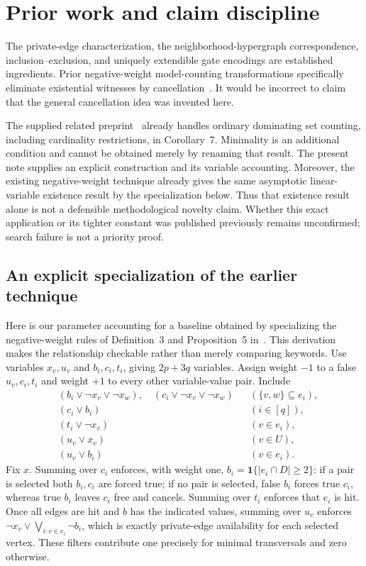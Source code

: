 \documentclass[11pt]{article}
\theoremstyle{remark}\newtheorem{remark}[theorem]{Remark}
\newcommand{\ind}[1]{\mathbf 1\{#1\}}
\begin{document}
\section{Prior work and claim discipline}\label{sec:prior}
The private-edge characterization, the neighborhood-hypergraph correspondence,
inclusion--exclusion, and uniquely extendible gate encodings are established
ingredients. Prior negative-weight model-counting transformations specifically
eliminate existential witnesses by cancellation~\cite{skolem}. It would be
incorrect to claim that the general cancellation idea was invented here.

The supplied related preprint~\cite{claude} already handles ordinary dominating
set counting, including cardinality restrictions, in Corollary~7. Minimality
is an additional condition and cannot be obtained merely by renaming that
result. The present note supplies an explicit construction and its variable
accounting. Moreover, the existing negative-weight technique already gives
the same asymptotic linear-variable existence result by the specialization
below. Thus that existence result alone is not a defensible methodological
novelty claim. Whether this exact application or its tighter constant was
published previously remains unconfirmed; search failure is not a priority proof.

\subsection{An explicit specialization of the earlier technique}
Here is our parameter accounting for a baseline obtained by specializing the
negative-weight rules of Definition~3 and Proposition~5 in~\cite{skolem}.
This derivation makes the relationship checkable rather than merely comparing
keywords. Use variables $x_v,u_v$ and $b_i,c_i,t_i$, giving $2p+3q$ variables.
Assign weight $-1$ to a false $u_v,c_i,t_i$ and weight $+1$ to every other
variable-value pair. Include
\begin{align*}
 &(b_i\vee\neg x_v\vee\neg x_w),\quad
   (c_i\vee\neg x_v\vee\neg x_w)
   &&(\{v,w\}\subseteq e_i),\\
 &(c_i\vee b_i) &&(i\in[q]),\\
 &(t_i\vee\neg x_v) &&(v\in e_i),\\
 &(u_v\vee x_v) &&(v\in U),\\
 &(u_v\vee b_i) &&(v\in e_i).
\end{align*}
Fix $x$. Summing over $c_i$ enforces, with weight one,
$b_i=\ind{|e_i\cap D|\ge2}$: if a pair is selected both $b_i,c_i$ are forced
true; if no pair is selected, false $b_i$ forces true $c_i$, whereas true
$b_i$ leaves $c_i$ free and cancels. Summing over $t_i$ enforces that $e_i$
is hit. Once all edges are hit and $b$ has the indicated values, summing over
$u_v$ enforces $\neg x_v\vee\bigvee_{i:v\in e_i}\neg b_i$, which is exactly
private-edge availability for each selected vertex. These filters contribute
one precisely for minimal transversals and zero otherwise.
\end{document}
